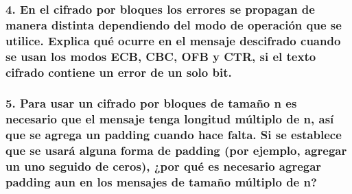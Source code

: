 \documentclass[12pt]{article}
\begin{document}
\subsubsection*{4. En el cifrado por bloques los errores se propagan de manera distinta dependiendo del modo de operación que se utilice. Explica qué ocurre en el mensaje descifrado cuando se usan los modos ECB, CBC, OFB y CTR, si el texto cifrado
contiene un error de un solo bit.}
\subsubsection*{5. Para usar un cifrado por bloques de tamaño n es necesario que el mensaje tenga longitud múltiplo de n, así que se agrega un padding cuando hace falta. Si se establece que se usará alguna forma de padding (por ejemplo, agregar un uno seguido de ceros), ¿por qué es necesario agregar padding aun en los mensajes de tamaño múltiplo de n?}
\end{document}
